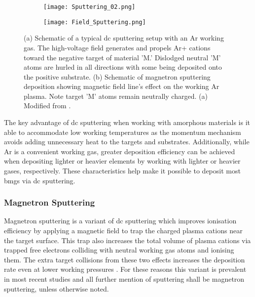 \documentclass[a4paper,12pt,oneside]{report}%
\begin{document}
\begin{figure}[bp]
	\centering
	\begin{subfigure}[htbp]{0.75\textwidth}
		\texttt{[image: Sputtering\_02.png]}
		\caption{}
		\label{fig:Sputter_Schematic}
	\end{subfigure}
	\begin{subfigure}[htbp]{0.75\textwidth}
		\texttt{[image: Field\_Sputtering.png]}
		\caption{}
		\label{fig:Field_Sputtering}
	\end{subfigure}
	\caption[(a) Schematic of a typical \acrshort{dc} sputtering setup with an Ar working gas. The high-voltage field generates and propels Ar+ cations toward the negative target of material 'M.' Dislodged neutral 'M' atoms are hurled in all directions with some being deposited onto the positive substrate. (b) Schematic of magnetron sputtering deposition showing magnetic field line's effect on the working Ar plasma. Note target 'M' atoms remain neutrally charged.]{(a) Schematic of a typical \acrshort{dc} sputtering setup with an Ar working gas. The high-voltage field generates and propels Ar+ cations toward the negative target of material 'M.' Dislodged neutral 'M' atoms are hurled in all directions with some being deposited onto the positive substrate. (b) Schematic of magnetron sputtering deposition showing magnetic field line's effect on the working Ar plasma. Note target 'M' atoms remain neutrally charged. (a) Modified from \cite{Brown2014}.}%
	\label{fig:Sputter}
\end{figure}

The key advantage of \gls{dc} sputtering when working with amorphous materials is it able to accommodate low working temperatures as the momentum mechanism avoids adding unnecessary heat to the targets and substrates. Additionally, while Ar is a convenient working gas, greater deposition efficiency can be achieved when depositing lighter or heavier elements by working with lighter or heavier gases, respectively. These characteristics help make it possible to deposit most \glspl{bmg} via \gls{dc} sputtering. 

\subsubsection{Magnetron Sputtering}
Magnetron sputtering is a variant of \gls{dc} sputtering which improves ionisation efficiency by applying a magnetic field to trap the charged plasma cations near the target surface. This trap also increases the total volume of plasma cations via trapped free electrons colliding with neutral working gas atoms and ionising them. The extra target collisions from these two effects increases the deposition rate even at lower working pressures . For these reasons this variant is prevalent in most recent studies and all further mention of sputtering shall be magnetron sputtering, unless otherwise noted. 
\end{document}
